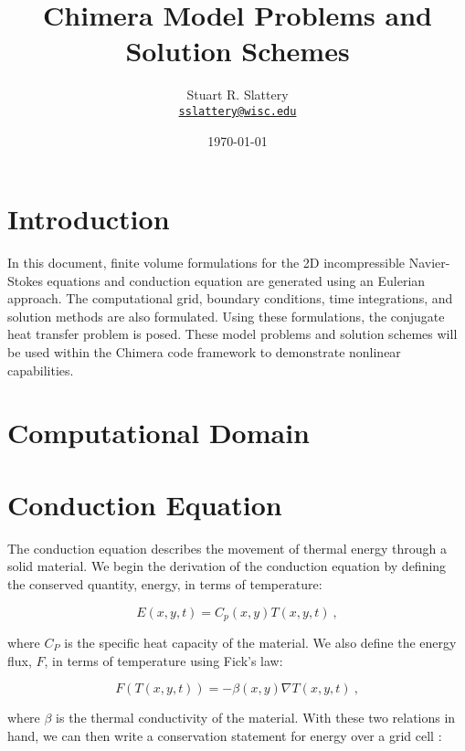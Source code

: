\documentclass[letterpaper,12pt]{article}
\author{Stuart R. Slattery
\\ \href{mailto:sslattery@wisc.edu}{\texttt{sslattery@wisc.edu}}
}
\date{\today}
\title{Chimera Model Problems and Solution Schemes}
\begin{document}
\maketitle

\section{Introduction}
In this document, finite volume formulations for the 2D incompressible
Navier-Stokes equations and conduction equation are generated using an
Eulerian approach. The computational grid, boundary conditions, time
integrations, and solution methods are also formulated. Using these
formulations, the conjugate heat transfer problem is posed. These
model problems and solution schemes will be used within the Chimera
code framework to demonstrate nonlinear capabilities.

\section{Computational Domain}

\section{Conduction Equation}
The conduction equation describes the movement of thermal energy
through a solid material. We begin the derivation of the conduction
equation by defining the conserved quantity, energy, in terms of
temperature:

\begin{equation}
  E(x,y,t) = C_p(x,y) T(x,y,t)\:,
  \label{eq:conduction_energy}
\end{equation}

where $C_P$ is the specific heat capacity of the material. We also
define the energy flux, $F$, in terms of temperature using Fick's law:

\begin{equation}
  F(T(x,y,t)) = -\beta(x,y) \nabla T(x,y,t)\:,
  \label{eq:conduction_ficks_law}
\end{equation}

where $\beta$ is the thermal conductivity of the material. With these
two relations in hand, we can then write a conservation statement for
energy over a grid cell \cite{leveque_2002}:
\end{document}
